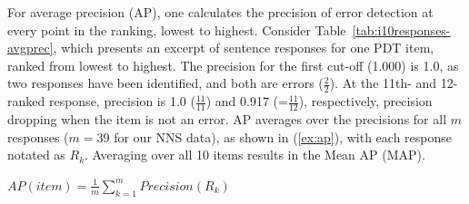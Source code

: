 For average precision (AP), one calculates the precision of error
detection at every point in the ranking, lowest to highest. Consider
Table~\ref{tab:i10responses-avgprec}, which presents an excerpt of sentence
responses for one PDT item, ranked from lowest to highest. The precision for
the first cut-off (1.000) is 1.0, as two responses have been
identified, and both are errors ($\frac{2}{2}$). At the 11th- and
12-ranked response, precision is 1.0 ($\frac{11}{11}$) and 0.917
(=$\frac{11}{12}$), respectively, precision dropping when the item is
not an error.
AP averages over the precisions for all $m$ responses ($m=39$ for our
NNS data), as shown in (\ref{ex:ap}), with each response notated as
$R_k$.  Averaging over all 10 items results in the Mean AP (MAP).


%
%

\begin{exe}
\ex\label{ex:ap} $AP(item) = \frac{1}{m} \sum\limits_{k=1}^m
Precision(R_k)$
\end{exe}


